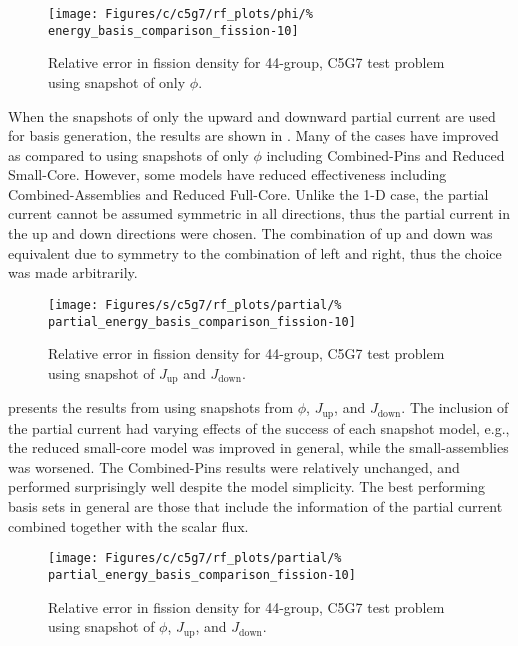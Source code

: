 \begin{figure*}[tb]
    \centering
    \texttt{[image: Figures/c/c5g7/rf\_plots/phi/\%
        energy\_basis\_comparison\_fission-10]}
    \caption{Relative error in fission density for 44-group, C5G7 test problem 
using snapshot of only $\phi$.}
    \label{fig:c5g7-flux-only}
\end{figure*}

When the snapshots of only the upward and downward partial current are used for 
basis generation, the results are shown in . Many of the 
cases have improved as compared to using snapshots of only $\phi$ including 
Combined-Pins and Reduced Small-Core.  However, some models have reduced 
effectiveness including Combined-Assemblies and Reduced Full-Core. Unlike the 
1-D case, the partial current 
cannot be assumed symmetric in all directions, thus the partial current in the 
up and down 
directions were chosen.  The combination of up and down was equivalent due to 
symmetry to 
the combination of left and right, thus the choice was made arbitrarily.  

\begin{figure*}[tb]
    \centering
    \texttt{[image: Figures/s/c5g7/rf\_plots/partial/\%
        partial\_energy\_basis\_comparison\_fission-10]}
    \caption{Relative error in fission density for 44-group, C5G7 test problem 
        using snapshot of $J_{\text{up}}$ and $J_{\text{down}}$.}
    \label{fig:c5g7-current}
\end{figure*}

 presents the results from using snapshots from 
$\phi$, $J_{\text{up}}$, and $J_{\text{down}}$.  The inclusion of the 
partial current had varying effects of the success of each snapshot model, e.g., the reduced 
small-core model was improved in general, while the small-assemblies was worsened.  The 
Combined-Pins results were relatively unchanged, and performed surprisingly well despite the model 
simplicity. The best performing basis sets in general are those that include 
the information of the partial current combined together with the scalar flux.

\begin{figure*}[tb]
    \centering
    \texttt{[image: Figures/c/c5g7/rf\_plots/partial/\%
        partial\_energy\_basis\_comparison\_fission-10]}
    \caption{Relative error in fission density for 44-group, C5G7 test problem 
        using snapshot of $\phi$, $J_{\text{up}}$, and $J_{\text{down}}$.}
    \label{fig:c5g7-combined}
\end{figure*}

